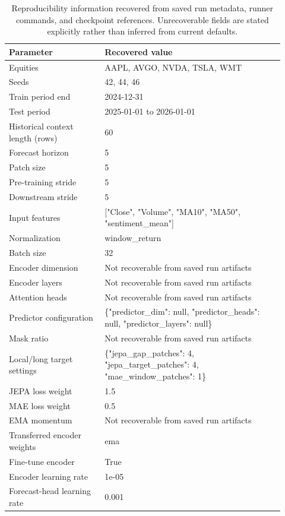 \begin{table}[p]
\centering
\small
\caption{Reproducibility information recovered from saved run metadata, runner commands, and checkpoint references. Unrecoverable fields are stated explicitly rather than inferred from current defaults.}
\label{tab:reproducibility}
\begin{tabular}{p{0.32\linewidth}p{0.60\linewidth}}
\toprule
Parameter & Recovered value \\
\midrule
Equities & AAPL, AVGO, NVDA, TSLA, WMT \\
Seeds & 42, 44, 46 \\
Train period end & 2024-12-31 \\
Test period & 2025-01-01 to 2026-01-01 \\
Historical context length (rows) & 60 \\
Forecast horizon & 5 \\
Patch size & 5 \\
Pre-training stride & 5 \\
Downstream stride & 5 \\
Input features & ["Close", "Volume", "MA10", "MA50", "sentiment\_mean"] \\
Normalization & window\_return \\
Batch size & 32 \\
Encoder dimension & Not recoverable from saved run artifacts \\
Encoder layers & Not recoverable from saved run artifacts \\
Attention heads & Not recoverable from saved run artifacts \\
Predictor configuration & \{"predictor\_dim": null, "predictor\_heads": null, "predictor\_layers": null\} \\
Mask ratio & Not recoverable from saved run artifacts \\
Local/long target settings & \{"jepa\_gap\_patches": 4, "jepa\_target\_patches": 4, "mae\_window\_patches": 1\} \\
JEPA loss weight & 1.5 \\
MAE loss weight & 0.5 \\
EMA momentum & Not recoverable from saved run artifacts \\
Transferred encoder weights & ema \\
Fine-tune encoder & True \\
Encoder learning rate & 1e-05 \\
Forecast-head learning rate & 0.001 \\

\end{tabular}
\end{table}
